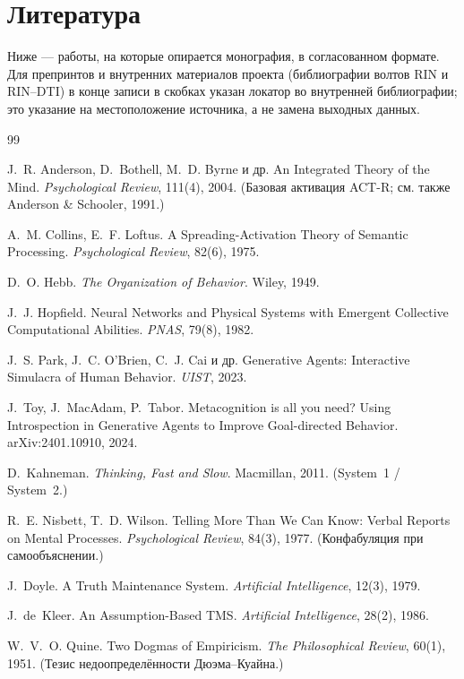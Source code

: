 \chapter{Литература}
\label{ch:references}

Ниже — работы, на которые опирается монография, в согласованном формате. Для
препринтов и внутренних материалов проекта (библиографии волтов RIN и RIN–DTI) в
конце записи в скобках указан локатор во внутренней библиографии; это указание на
местоположение источника, а не замена выходных данных.

\begin{thebibliography}{99}
\small

 J.~R. Anderson, D.~Bothell, M.~D. Byrne и др.
An Integrated Theory of the Mind. \emph{Psychological Review}, 111(4), 2004.
(Базовая активация ACT-R; см. также Anderson \& Schooler, 1991.)

 A.~M. Collins, E.~F. Loftus.
A Spreading-Activation Theory of Semantic Processing.
\emph{Psychological Review}, 82(6), 1975.

 D.~O. Hebb. \emph{The Organization of Behavior}. Wiley, 1949.

 J.~J. Hopfield.
Neural Networks and Physical Systems with Emergent Collective Computational
Abilities. \emph{PNAS}, 79(8), 1982.

 J.~S. Park, J.~C. O'Brien, C.~J. Cai и др.
Generative Agents: Interactive Simulacra of Human Behavior. \emph{UIST}, 2023.

 J.~Toy, J.~MacAdam, P.~Tabor.
Metacognition is all you need? Using Introspection in Generative Agents to Improve
Goal-directed Behavior. arXiv:2401.10910, 2024.

 D.~Kahneman. \emph{Thinking, Fast and Slow}. Macmillan, 2011.
(System~1 / System~2.)

 R.~E. Nisbett, T.~D. Wilson.
Telling More Than We Can Know: Verbal Reports on Mental Processes.
\emph{Psychological Review}, 84(3), 1977. (Конфабуляция при самообъяснении.)

 J.~Doyle. A Truth Maintenance System.
\emph{Artificial Intelligence}, 12(3), 1979.

 J.~de~Kleer. An Assumption-Based TMS.
\emph{Artificial Intelligence}, 28(2), 1986.

 W.~V.~O. Quine. Two Dogmas of Empiricism.
\emph{The Philosophical Review}, 60(1), 1951. (Тезис недоопределённости
Дюэма–Куайна.)


\end{thebibliography}
